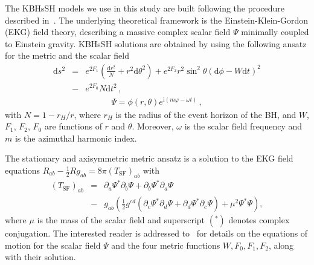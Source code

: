 \documentclass[twocolumn,aps,showpacs,showkeys,prd,superscriptaddress,byrevtex, amsmath]{revtex4-1}
\begin{document}
The KBHsSH models we use in this study are built following the procedure described in~\cite{Herdeiro:2015b}. The underlying theoretical framework is the Einstein-Klein-Gordon (EKG) field theory, describing a massive complex scalar field $\Psi$ minimally coupled to Einstein gravity. KBHsSH solutions are obtained by using the following ansatz for the metric and the scalar field~\cite{Herdeiro:2014a}
\begin{eqnarray}
\mathrm{d}s^2 &=& e^{2F_1}\left(\frac{\mathrm{d}r^2}{N} + r^2\mathrm{d}\theta^2\right) +  e^{2F_2}r^2\sin^2 \theta(\mathrm{d}\phi-W\mathrm{d}t)^2 
\nonumber \\ 
&-&  e^{2F_0}N\mathrm{d}t^2\,,
\label{metric}
\end{eqnarray}
\begin{eqnarray}
\Psi = \phi(r, \theta) e^{\mathrm{i}(m\varphi - \omega t)} \,,
\end{eqnarray}
with $N = 1 - r_H/r$, where $r_H$ is the radius of the event horizon of the BH, and $W$, $F_1$, $F_2$, $F_0$ are functions of $r$ and $\theta$. Moreover, $\omega$ is the scalar field frequency and $m$ is the azimuthal harmonic index.

The stationary and axisymmetric metric ansatz is a solution to the EKG field equations $R_{ab} - \frac{1}{2}R g _{ab} = 8 \pi (T_{\mathrm{SF}})_{ab}$ with 
\begin{eqnarray}\label{eq:e-m_scalaf_field}
(T_{\mathrm{SF}})_{ab} &=& \partial_a \Psi^* \partial_b \Psi + \partial_b \Psi^* \partial_a \Psi 
\nonumber \\ 
&-& g_{ab} \left(\frac{1}{2} g^{cd}(\partial_c \Psi^* \partial_d \Psi + \partial_d \Psi^* \partial_c \Psi) + \mu^2 \Psi^* \Psi \right),
\end{eqnarray}
where $\mu$ is the mass of the scalar field and superscript $(^*)$ denotes complex conjugation. The interested reader is addressed to~\cite{Herdeiro:2015b} for details on the equations of motion for the scalar field $\Psi$ and the four metric functions ${W, F_0,F_1,F_2}$, along with their solution.
\end{document}
